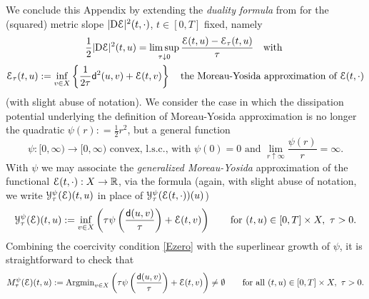 \documentclass[a4paper,10pt,reqno]{amsart} %
\newcommand{\R}{\mathbb{R}}
\numberwithin{equation}{section}
\newcommand{\up}{\uparrow}
\newcommand{\down}{\downarrow}
\def\calY{{\mathcal Y}} \def\calZ{{\mathcal Z}}
\newcommand{\Xs}{X}
\newcommand{\mdn}{\mathsf{d}}
\newcommand{\md}[2]{\mathsf{d}(#1,#2)}
\newcommand{\RRR}{\color{red}}
\begin{document}
\par
We conclude this Appendix by  extending the \emph{duality formula} 
from \cite[Lemma 3.1.5]{AGS08} for the  (squared) metric  slope  $|\mathrm{D} {\mathcal E}|^2(t,\cdot)$,  $t\in [0,T]$ fixed, namely
\begin{equation}
\label{duality-quadratic}
\begin{gathered}
\frac12 |\mathrm{D} \calE|^2(t,u)= \limsup_{\tau \down 0} \frac{\calE(t,u)-\calE_\tau(t,u)}{\tau} \quad \text{with } 
\\
\calE_\tau(t,u): = \inf_{v\in \Xs} \left\{ \frac1{2\tau} \mdn^2(u,v) + \calE(t,v) \right\} \quad \text{the Moreau-Yosida approximation of } \calE(t,\cdot)
\end{gathered}
\end{equation}
(with slight abuse of notation). 
We consider
 the case in which  the  dissipation potential underlying the definition of Moreau-Yosida approximation  is no longer  the quadratic
 $\psi(r): = \frac12 r^2$,
  but a general
  function
  \begin{equation}
\label{superlinear-case}
\psi: [0,\infty)\to [0,\infty) \text{ convex, l.s.c., with } \psi(0)=0 \text{ and }   \lim_{r\up\infty}\frac{\psi(r)}r =\infty. 
\end{equation}
With $\psi$ we may associate  the \emph{generalized Moreau-Yosida} approximation 
of the  functional  $\calE(t,\cdot): \Xs \to \R$, via the formula (again, with slight abuse of notation, we write $ \calY_\tau^\psi(\calE)(t,u)$ in place of $ \calY_\tau^\psi(\calE(t,\cdot))(u)$) 
\begin{equation}
\label{psi-MY}
 \calY_\tau^\psi(\calE)(t,u): = \inf_{v\in \Xs} \left(  \tau \psi \left( \frac{\md{u}v}\tau \right) +\calE(t,v)  \right) \qquad \text{for } (t,u)\in [0,T]\times \Xs,\ \tau>0. 
\end{equation}
Combining the coercivity condition \eqref{Ezero} with the superlinear growth of $\psi$, it is straightforward to check that 
\[
M_\tau^\psi(\calE)(t,u):=  \mathrm{Argmin}_{v\in \Xs} \left( \tau \psi \left( \frac{\md{u}v}\tau \right)+ \calE(t,v)  \right) \neq \emptyset \qquad  \text{for all  } (t,u)\in [0,T]\times \Xs,\ \tau>0. 
\]
\end{document}

